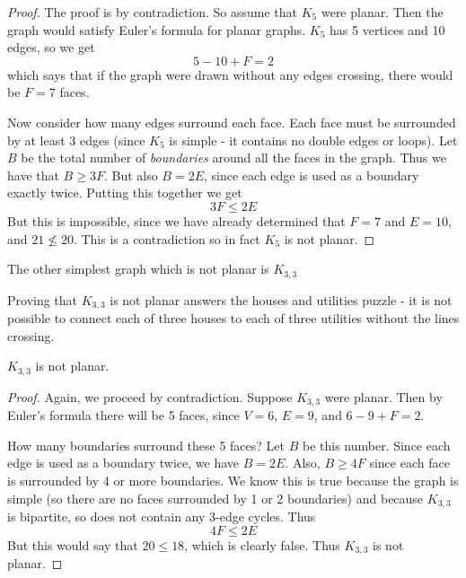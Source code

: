 \documentclass[12pt]{article}
\begin{document}
\begin{proof}
  The proof is by contradiction.  So assume that $K_5$ were planar.  Then the graph would satisfy Euler's formula for planar graphs.  $K_5$ has 5 vertices and 10 edges, so we get 
  \[5 - 10 + F = 2\]
  which says that if the graph were drawn without any edges crossing, there would be $F = 7$ faces.
  
  Now consider how many edges surround each face.  Each face must be surrounded by at least 3 edges (since $K_5$ is simple - it contains no double edges or loops).  Let $B$ be the total number of {\em boundaries} around all the faces in the graph.  Thus we have that $B \ge 3F$.  But also $B = 2E$, since each edge is used as a boundary exactly twice.  Putting this together we get
  \[3F \le 2E\]
  But this is impossible, since we have already determined that $F = 7$ and $E = 10$, and $21 \not\le 20$.  This is a contradiction so in fact $K_5$ is not planar.
\end{proof}

The other simplest graph which is not planar is $K_{3,3}$
    \begin{center}
    \end{center}
    
Proving that $K_{3,3}$ is not planar answers the houses and utilities puzzle - it is not possible to connect each of three houses to each of three utilities without the lines crossing.

\begin{theorem}
  $K_{3,3}$ is not planar.
\end{theorem}

\begin{proof}
  Again, we proceed by contradiction.  Suppose $K_{3,3}$ were planar.  Then by Euler's formula there will be 5 faces, since $V = 6$, $E = 9$, and $6 - 9 + F = 2$.
  
  How many boundaries surround these 5 faces?  Let $B$ be this number.  Since each edge is used as a boundary twice, we have $B = 2E$.  Also, $B \ge 4F$ since each face is surrounded by 4 or more boundaries.  We know this is true because the graph is simple (so there are no faces surrounded by 1 or 2 boundaries) and because $K_{3,3}$ is bipartite, so does not contain any 3-edge cycles.  Thus
  \[4F \le 2E\]
  But this would say that $20 \le 18$, which is clearly false.  Thus $K_{3,3}$ is not planar.
\end{proof}
\end{document}
